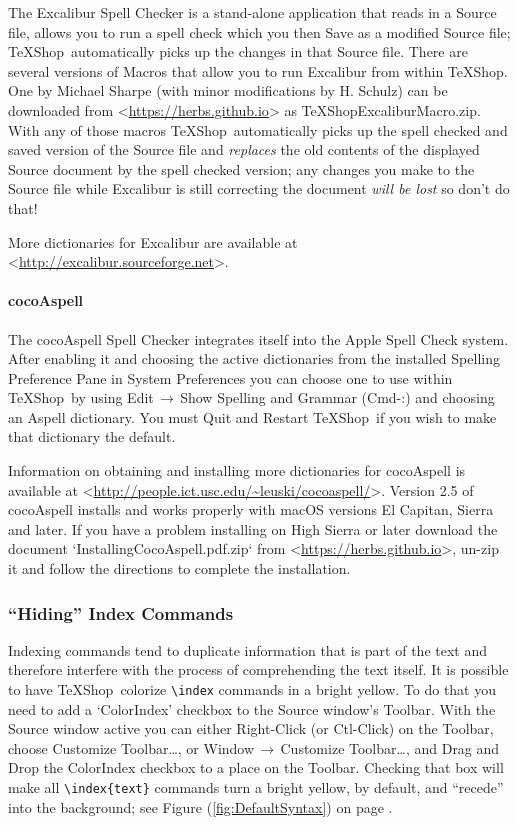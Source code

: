 \documentclass[letterpaper,11pt]{article}
\newcommand{\TS}{\textsf{\TeX Shop}}
\newcommand{\cmd}[1]{\textsf{#1}}
\newcommand{\mnu}[1]{\textsf{#1}}
\newcommand{\To}{\,\(\to\)\,}
\begin{document}
The \cmd{Excalibur} Spell Checker is a stand-alone application that reads in a Source file, allows you to run a spell check which you then Save as a modified Source file; \TS\ automatically picks up the changes in that Source file. There are several versions of Macros that allow you to run \cmd{Excalibur} from within \TS. One by Michael Sharpe (with minor modifications by H. Schulz) can be downloaded from <\url{https://herbs.github.io}> as \cmd{TeXShopExcaliburMacro.zip}. With any of those macros \TS\ automatically picks up the spell checked and saved version of the Source file and \emph{replaces} the old contents of the displayed Source document by the spell checked version; any changes you make to the Source file while \cmd{Excalibur} is still correcting the document \emph{will be lost} so don't do that!

More dictionaries for \cmd{Excalibur} are available at <\url{http://excalibur.sourceforge.net}>.

\paragraph{\cmd{cocoAspell}}

The \cmd{cocoAspell} Spell Checker integrates itself into the Apple Spell Check system. After enabling it and choosing the active dictionaries from the installed \cmd{Spelling} Preference Pane in \cmd{System Preferences} you can choose one to use within \TS\ by using \mnu{Edit}\To\mnu{Show Spelling and Grammar} (\cmd{Cmd-:}) and choosing an \cmd{Aspell} dictionary. You must \cmd{Quit} and Restart \TS\ if you wish to make that dictionary the default.

Information on obtaining and installing more dictionaries for \cmd{cocoAspell} is available at <\url{http://people.ict.usc.edu/~leuski/cocoaspell/}>. Version 2.5 of \cmd{cocoAspell} installs and works properly with \cmd{macOS} versions \cmd{El Capitan}, \cmd{Sierra} and later. If you have a problem installing on \cmd{High Sierra} or later download the document `\cmd{InstallingCocoAspell.pdf.zip}` from <\url{https://herbs.github.io}>, un-zip it and follow the directions to complete the installation.


\subsubsection{``Hiding'' Index Commands}\label{sec:Index}

Indexing commands tend to duplicate information that is part of the text and therefore interfere with the process of comprehending the text itself. It is possible to have \TS\ colorize \verb|\index| commands in a bright yellow. To do that you need to add a `\cmd{ColorIndex}' checkbox to the Source window's Toolbar. With the Source window active you can either \cmd{Right-Click} (or \cmd{Ctl-Click}) on the Toolbar, choose \mnu{Customize Toolbar\dots}, or \mnu{Window}\To\mnu{Customize Toolbar\dots}, and Drag and Drop the \cmd{ColorIndex} checkbox to a place on the Toolbar. Checking that box will make all \verb"\index{text}" commands turn a bright yellow, by default, and ``recede'' into the background; see Figure (\ref{fig:DefaultSyntax}) on page \pageref{fig:DefaultSyntax}.
\end{document}
